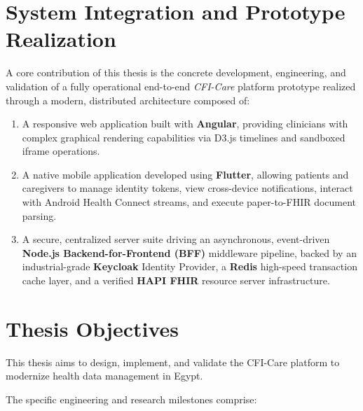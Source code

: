 \section{System Integration and Prototype Realization}
\hspace*{2em}A core contribution of this thesis is the concrete development, 
engineering, and validation of a fully operational end-to-end \textit{CFI-Care} platform prototype 
realized through a modern, distributed architecture composed of:
\begin{enumerate}
    \item A responsive web application built with \textbf{Angular}, providing clinicians with complex graphical rendering capabilities via D3.js timelines and sandboxed iframe operations.
    \item A native mobile application developed using \textbf{Flutter}, allowing patients and caregivers to manage identity tokens, view cross-device notifications, interact with Android Health Connect streams, and execute paper-to-FHIR document parsing.
    \item A secure, centralized server suite driving an asynchronous, event-driven \textbf{Node.js Backend-for-Frontend (BFF)} middleware pipeline, backed by an industrial-grade \textbf{Keycloak} Identity Provider, a \textbf{Redis} high-speed transaction cache layer, and a verified \textbf{HAPI FHIR} resource server infrastructure.
\end{enumerate}


\section{Thesis Objectives}
This thesis aims to design, implement, and validate the CFI-Care platform to modernize health data
management in Egypt.

The specific engineering and research milestones comprise:


